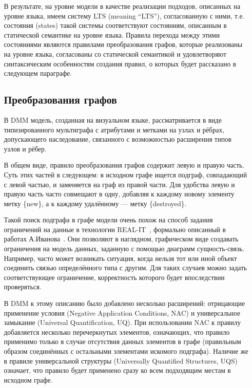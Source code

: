 \documentclass[a5paper]{article}
\begin{document}
В результате, на уровне модели в качестве реализации подходов, описанных на уровне языка, имеем систему LTS (meaning “LTS”), согласованную с ними, т.е. состояния (states) такой системы соответствуют состояниям, описанным в статической семантике на уровне языка. Правила перехода между этими состояниями являются правилами преобразования графов, которые реализованы на уровне языка, согласованы со статической семантикой и удовлетворяют синтаксическим особенностям создания правил, о которых будет рассказано в следующем параграфе.

\subsection{Преобразования графов}

В DMM модель, созданная на визуальном языке, рассматривается в виде типизированного мультиграфа с атрибутами и метками на узлах и рёбрах, допускающего наследование, связанного с возможностью расширения типов узлов и рёбер.

В общем виде, правило преобразования графов содержит левую и правую часть. Суть этих частей в следующем: в исходном графе ищется подграф, совпадающий с левой частью, и заменяется на граф из правой части. Для удобства левую и правую часть часто совмещают в одну, добавляя к каждому новому элементу метку \{new\}, а к каждому удалённому — метку \{destroyed\}.

Такой поиск подграфа в графе модели очень похож на способ задания ограничений на данные в технологии REAL-IT~\cite{ivanov2}, формально описанный в работах А.Иванова~\cite{ivanov1, ivanov2, ivanov3}. Они позволяют в наглядном, графическом виде создавать ограничения на модель данных, заданную с помощью диаграмм сущность-связь. Например, часто может возникать ситуация, когда нельзя тот или иной объект соединить связью определённого типа с другим. Для таких случаев можно задать соответствующее ограничение, корректность которого будет впоследствии проверяться.

В DMM к этому описанию было добавлено несколько расширений: отрицающие применение условия (Negative Application Conditions, NAC) и универсальное замыкание (Universal Quantification, UQ). При использовании NAC к правилу добавляется несколько перечеркнутых элементов, означающих, что правило применимо только в случае отсутствия данных элементов в графе (правильным образом соединённых с остальными элементами искомого подграфа). Наличие же в правиле универсальной структуры (Universally Quantified Structures, UQS) означает, что правило будет применено сразу ко всем подходящим местам в исходном графе.
\end{document}
